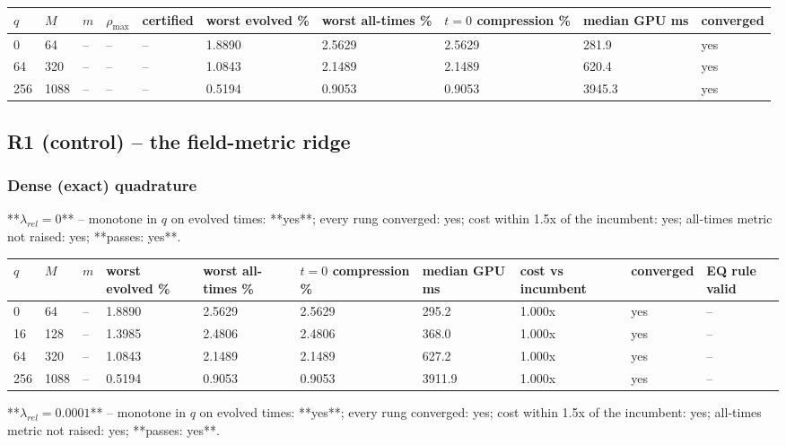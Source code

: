 \documentclass[11pt]{article}
\begin{document}
\begin{table}[htbp]\centering\small
\begin{tabular}{llllllllll}\hline
$q$ & $M$ & $m$ & $\rho_{\max}$ & certified & worst evolved \% & worst all-times \% & $t=0$ compression \% & median GPU ms & converged \\ \hline
0 & 64 & -- & -- & -- & 1.8890 & 2.5629 & 2.5629 & 281.9 & yes \\
64 & 320 & -- & -- & -- & 1.0843 & 2.1489 & 2.1489 & 620.4 & yes \\
256 & 1088 & -- & -- & -- & 0.5194 & 0.9053 & 0.9053 & 3945.3 & yes \\
\hline\end{tabular}
\end{table}
\subsection{R1 (control) -- the field-metric ridge}
\subsubsection{Dense (exact) quadrature}
**$\lambda_{rel} = 0$** -- monotone in $q$ on evolved times: **yes**; every rung converged: yes; cost within 1.5x of the incumbent: yes; all-times metric not raised: yes; **passes: yes**.

\begin{table}[htbp]\centering\small
\begin{tabular}{llllllllll}\hline
$q$ & $M$ & $m$ & worst evolved \% & worst all-times \% & $t=0$ compression \% & median GPU ms & cost vs incumbent & converged & EQ rule valid \\ \hline
0 & 64 & -- & 1.8890 & 2.5629 & 2.5629 & 295.2 & 1.000x & yes & -- \\
16 & 128 & -- & 1.3985 & 2.4806 & 2.4806 & 368.0 & 1.000x & yes & -- \\
64 & 320 & -- & 1.0843 & 2.1489 & 2.1489 & 627.2 & 1.000x & yes & -- \\
256 & 1088 & -- & 0.5194 & 0.9053 & 0.9053 & 3911.9 & 1.000x & yes & -- \\
\hline\end{tabular}
\end{table}
**$\lambda_{rel} = 0.0001$** -- monotone in $q$ on evolved times: **yes**; every rung converged: yes; cost within 1.5x of the incumbent: yes; all-times metric not raised: yes; **passes: yes**.
\end{document}
